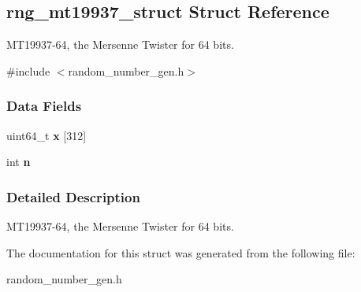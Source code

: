 \hypertarget{structrng__mt19937__struct}{}\subsection{rng\+\_\+mt19937\+\_\+struct Struct Reference}
\label{structrng__mt19937__struct}


M\+T19937-\/64, the Mersenne Twister for 64 bits.  




{\ttfamily \#include $<$random\+\_\+number\+\_\+gen.\+h$>$}

\subsubsection*{Data Fields}
\begin{DoxyCompactItemize}
\item 
\mbox{\label{structrng__mt19937__struct_aa6645c0238b70abeae6ddf001106bd95}} 
uint64\+\_\+t {\bfseries x} \mbox{[}312\mbox{]}
\item 
\mbox{\label{structrng__mt19937__struct_a0bc4a64835d20417637939d75d298bd3}} 
int {\bfseries n}
\end{DoxyCompactItemize}


\subsubsection{Detailed Description}
M\+T19937-\/64, the Mersenne Twister for 64 bits. 

The documentation for this struct was generated from the following file\+:\begin{DoxyCompactItemize}
\item 
random\+\_\+number\+\_\+gen.\+h\end{DoxyCompactItemize}

